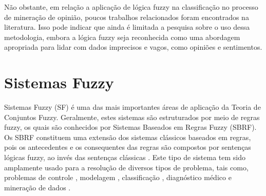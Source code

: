 \documentclass[template.tex]{subfiles}
\begin{document}
Não obstante, em relação a aplicação de lógica fuzzy na classificação no processo de mineração de opinião, poucos trabalhos relacionados foram encontrados na literatura. Isso pode indicar que ainda é limitada a pesquisa sobre o uso dessa metodologia, embora a lógica fuzzy seja reconhecida como uma abordagem apropriada para lidar com dados imprecisos e vagos, como opiniões e sentimentos.

\section{Sistemas Fuzzy}
\label{secao-sistemas-fuzzy}

Sistemas Fuzzy (SF) é uma das mais importantes áreas de aplicação da Teoria de Conjuntos Fuzzy. Geralmente, estes sistemas são estruturados por meio de regras fuzzy, os quais são conhecidos por Sistemas Baseados em Regras Fuzzy (SBRF). Os SBRF constituem uma extensão dos sistemas clássicos baseados em regras, pois os antecedentes e os consequentes das regras são compostos por sentenças lógicas fuzzy, ao invés das sentenças clássicas \cite{herrera2008genetic}. Este tipo de sistema tem sido amplamente usado para a resolução de diversos tipos de problema, tais como, problemas de controle \cite{mamdani1974application, mamdani1975experiment}, modelagem \cite{pedrycz1996fuzzy}, classificação \cite{ishibuchi1994construction, ishibuchi1995selecting}, diagnóstico médico \cite{sivasankar2010knowledge} e mineração de dados \cite{ishibuchi2005classification}.
\end{document}
